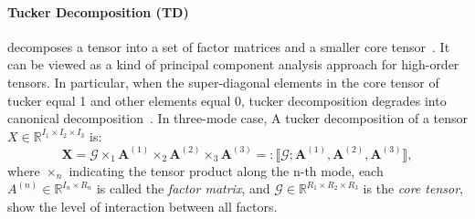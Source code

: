 \paragraph{Tucker Decomposition (TD)} decomposes a tensor into a set of factor matrices and a smaller core tensor~\cite{tucker1964extension}. It can be viewed as a kind of principal component analysis approach for high-order tensors. In particular, when the super-diagonal elements in the core tensor of tucker equal 1 and other elements equal 0, tucker decomposition degrades into canonical decomposition~\cite{xiao2023tucker}. In three-mode case, A tucker decomposition of a tensor $X \in \mathbb{R}^{I_1\times I_2\times I_3}$ is:
\begin{equation}    
\boldsymbol{X}=\mathcal{G} \times_{1} \mathbf{A}^{(1)} \times_{2} \mathbf{A}^{(2)} \times_{3} \mathbf{A}^{(3)}=: \llbracket \mathcal{G} ; \mathbf{A}^{(1)}, \mathbf{A}^{(2)}, \mathbf{A}^{(3)} \rrbracket,
\end{equation}
where $\times_n$ indicating the tensor product along the n-th mode, each $A^{(n)} \in \mathbb{R}^{I_n \times R_n}$ is called the \textit{factor matrix}, and $\mathcal{G} \in \mathbb{R}^{R_1 \times R_2 \times R_3}$ is the \textit{core tensor}, show the level of interaction between all factors.







